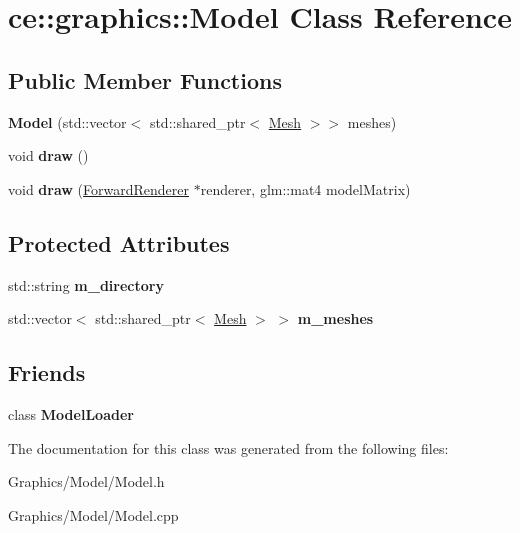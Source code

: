 \hypertarget{classce_1_1graphics_1_1_model}{}\section{ce\+:\+:graphics\+:\+:Model Class Reference}
\label{classce_1_1graphics_1_1_model}
\subsection*{Public Member Functions}
\begin{DoxyCompactItemize}
\item 
\mbox{\label{classce_1_1graphics_1_1_model_ae80b6da77f07543d9d423ca4884c63d1}} 
{\bfseries Model} (std\+::vector$<$ std\+::shared\+\_\+ptr$<$ \hyperlink{classce_1_1graphics_1_1_mesh}{Mesh} $>$$>$ meshes)
\item 
\mbox{\label{classce_1_1graphics_1_1_model_a32e4b5c3880eec770dabd21f8b053d49}} 
void {\bfseries draw} ()
\item 
\mbox{\label{classce_1_1graphics_1_1_model_a7bc6f7fd875dbfadc56576815c85844c}} 
void {\bfseries draw} (\hyperlink{classce_1_1graphics_1_1_forward_renderer}{Forward\+Renderer} $\ast$renderer, glm\+::mat4 model\+Matrix)
\end{DoxyCompactItemize}
\subsection*{Protected Attributes}
\begin{DoxyCompactItemize}
\item 
\mbox{\label{classce_1_1graphics_1_1_model_a326b8332797594d1c5bb18ddb0e8d953}} 
std\+::string {\bfseries m\+\_\+directory}
\item 
\mbox{\label{classce_1_1graphics_1_1_model_a03d7857dc5c72c845ff0664ac2abc2ec}} 
std\+::vector$<$ std\+::shared\+\_\+ptr$<$ \hyperlink{classce_1_1graphics_1_1_mesh}{Mesh} $>$ $>$ {\bfseries m\+\_\+meshes}
\end{DoxyCompactItemize}
\subsection*{Friends}
\begin{DoxyCompactItemize}
\item 
\mbox{\label{classce_1_1graphics_1_1_model_ac22dade55c1e8f81ea3e0892cd321190}} 
class {\bfseries Model\+Loader}
\end{DoxyCompactItemize}


The documentation for this class was generated from the following files\+:\begin{DoxyCompactItemize}
\item 
Graphics/\+Model/Model.\+h\item 
Graphics/\+Model/Model.\+cpp\end{DoxyCompactItemize}

